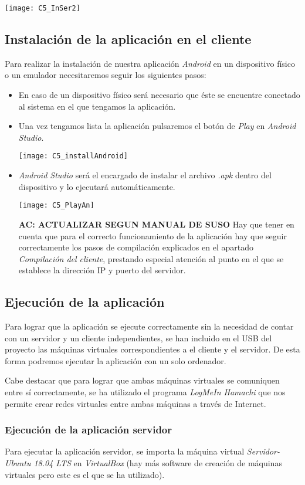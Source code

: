 \texttt{[image: C5\_InSer2]}


\subsection{Instalación de la aplicación en el cliente}
Para realizar la instalación de nuestra aplicación \textit{Android} en un dispositivo físico o un emulador necesitaremos seguir los siguientes pasos:
\begin{itemize}
\item En caso de un dispositivo físico será necesario que éste se encuentre conectado al sistema en el que tengamos la aplicación.
\item Una vez tengamos lista la aplicación pulsaremos el botón de \textit{Play} en \textit{Android Studio}.

\texttt{[image: C5\_installAndroid]}

\item \textit{Android Studio} será el encargado de instalar el archivo \textit{.apk} dentro del dispositivo y lo ejecutará automáticamente.

\texttt{[image: C5\_PlayAn]}

\textbf{AC: ACTUALIZAR SEGUN MANUAL DE SUSO}
Hay que tener en cuenta que para el correcto funcionamiento de la aplicación hay que seguir correctamente los pasos de compilación explicados en el apartado \textit{Compilación del cliente}, prestando especial atención al punto en el que se establece la dirección IP y puerto del servidor.

\end{itemize}
\subsection{Ejecución de la aplicación}
Para lograr que la aplicación se ejecute correctamente sin la necesidad de contar con un servidor y un cliente independientes, se han incluido en el USB del proyecto las máquinas virtuales correspondientes a el cliente y el servidor. De esta forma podremos ejecutar la aplicación con un solo ordenador.

Cabe destacar que para lograr que ambas máquinas virtuales se comuniquen entre sí correctamente, se ha utilizado el programa \textit{LogMeIn Hamachi} que nos permite crear redes virtuales entre ambas máquinas a través de Internet.
\subsubsection{Ejecución de la aplicación servidor}
Para ejecutar la aplicación servidor, se importa la máquina virtual \textit{Servidor-Ubuntu 18.04 LTS} en \textit{VirtualBox} (hay más software de creación de máquinas virtuales pero este es el que se ha utilizado).

